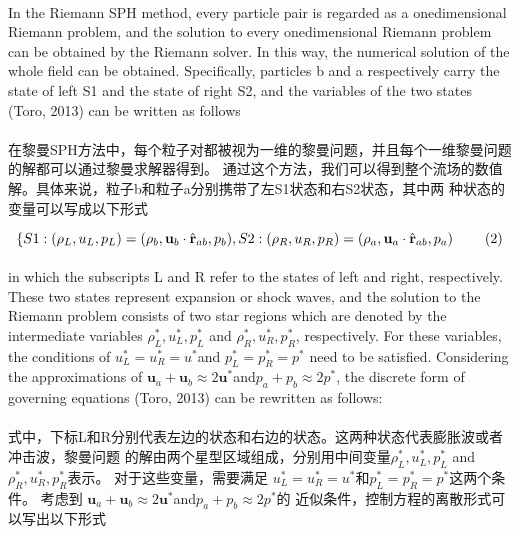 \documentclass[UTF8]{ctexart}
\begin{document}
\paragraph{\quad}In the Riemann SPH method, every particle pair is regarded as a onedimensional 
                Riemann problem, and the solution to every onedimensional Riemann problem can 
                be obtained by the Riemann solver. In this way, the numerical solution of the whole 
                field can be obtained. Specifically, particles b and a respectively carry the state 
                of left S1 and the state of right S2, and the variables of the two states (Toro, 2013) 
                can be written as follows
\paragraph{\quad}在黎曼SPH方法中，每个粒子对都被视为一维的黎曼问题，并且每个一维黎曼问题的解都可以通过黎曼求解器得到。
                通过这个方法，我们可以得到整个流场的数值解。具体来说，粒子b和粒子a分别携带了左S1状态和右S2状态，其中两
                种状态的变量可以写成以下形式

\begin{equation}
   \left\{ S1:(\rho_L,u_L,p_L)=(\rho_b,\mathbf{u}_b\cdot\hat{\mathbf{r}}_{ab},p_b), \\
   S2:(\rho_R,u_R,p_R)=(\rho_a,\mathbf{u}_a\cdot\hat{\mathbf{r}}_{ab},p_a) \right. \qquad(2)
\end{equation}

\paragraph{\quad}in which the subscripts L and R refer to the states of left and right, 
                respectively. These two states represent expansion or shock waves, and 
                the solution to the Riemann problem consists of two star regions which 
                are denoted by the intermediate variables $\rho^*_L, u^*_L, p^*_L$ and $\rho^*_R, u^*_R, p^*_R$, 
                respectively. For these variables, the conditions of $u^*_L = u^*_R = u^* $and $p^*_L = p^*_R = p^* $
                need to be satisfied. Considering the approximations of $\mathbf{u}_a + \mathbf{u}_b \approx 2\mathbf{u}^* $and$p_a + p_b \approx 2p^*$, 
                the discrete form of governing equations (Toro, 2013) can be rewritten as follows:
\paragraph{\quad}式中，下标L和R分别代表左边的状态和右边的状态。这两种状态代表膨胀波或者冲击波，黎曼问题
                的解由两个星型区域组成，分别用中间变量$\rho^*_L, u^*_L, p^*_L$ and $\rho^*_R, u^*_R, p^*_R$表示。
                对于这些变量，需要满足 $u^*_L = u^*_R = u^* $和$p^*_L = p^*_R = p^* $这两个条件。
                考虑到 $\mathbf{u}_a + \mathbf{u}_b \approx 2\mathbf{u}^* $and$p_a + p_b \approx 2p^*$的
                近似条件，控制方程的离散形式可以写出以下形式
\end{document}
